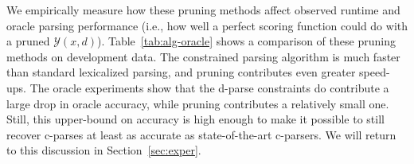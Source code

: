 \documentclass[11pt,letterpaper]{article}
\newcommand{\rules}{\mathcal{G}}
\newcommand{\Rule}[3]{#1 \rightarrow #2\ #3}
\begin{document}
 

We empirically measure how these pruning methods affect observed
runtime and oracle parsing performance (i.e., how well a perfect
scoring function could do with a pruned $\mathcal{Y}(x, d)$).
Table~\ref{tab:alg-oracle} shows a comparison of these pruning methods
on development data. The constrained parsing algorithm is much faster
than standard lexicalized parsing, and pruning contributes even greater 
speed-ups. The oracle experiments show that the d-parse
constraints do contribute a large drop in oracle accuracy, while pruning
contributes a relatively small one.  Still, this upper-bound on
accuracy is high enough to make it possible to still recover c-parses
at least as accurate as state-of-the-art c-parsers. We will return to
this discussion in Section~\ref{sec:exper}.




\end{document}
